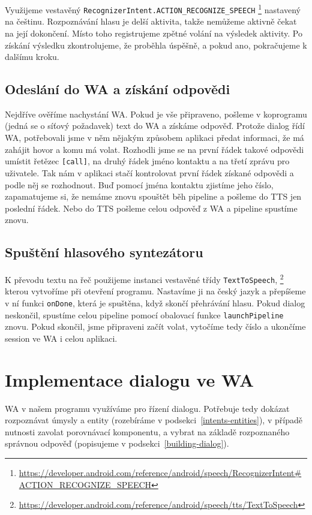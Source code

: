 Využijeme vestavěný \texttt{RecognizerIntent.ACTION\_RECOGNIZE\_SPEECH}%
\footnote{\url{https://developer.android.com/reference/android/speech/RecognizerIntent\#ACTION\_RECOGNIZE\_SPEECH}}
nastavený na češtinu. Rozpoznávání hlasu je delší aktivita, takže nemůžeme
aktivně čekat na její
dokončení. Místo toho registrujeme zpětné volání na výsledek aktivity.
Po získání výsledku zkontrolujeme, že proběhla úspěšně, a pokud ano, pokračujeme
k dalšímu kroku.

\subsection{Odeslání do WA a získání odpovědi}\label{contact-wa}
Nejdříve ověříme nachystání WA. Pokud je vše připraveno,
pošleme v koprogramu (jedná se o síťový požadavek) text do WA a získáme odpověď.
Protože dialog řídí WA, potřebovali jsme v něm nějakým způsobem aplikaci
předat informaci, že má zahájit hovor a komu má volat. Rozhodli jsme se na první
řádek takové odpovědi umístit řetězec \texttt{[call]}, na druhý řádek jméno kontaktu
a na třetí zprávu pro uživatele. Tak nám v aplikaci stačí kontrolovat první řádek získané
odpovědi a podle něj se rozhodnout. Buď pomocí jména kontaktu zjistíme jeho číslo, zapamatujeme
si, že nemáme znovu spouštět běh pipeline a pošleme do TTS jen poslední řádek.
Nebo do TTS pošleme celou odpověď z WA a pipeline spustíme znovu.

\subsection{Spuštění hlasového syntezátoru}\label{start-tts}

K převodu textu na řeč použijeme instanci vestavěné
třídy \texttt{TextToSpeech},%
\footnote{\url{https://developer.android.com/reference/android/speech/tts/TextToSpeech}}
kterou vytvoříme při otevření programu. Nastavíme
ji na český jazyk a přepíšeme v ní funkci \texttt{onDone}, která je spuštěna,
když skončí přehrávání hlasu. Pokud dialog neskončil, spustíme celou pipeline
pomocí obalovací funkce \texttt{launchPipeline} znovu. Pokud
skončil, jsme připraveni začít volat, vytočíme tedy číslo a ukončíme session ve
WA i celou aplikaci.

\section{Implementace dialogu ve WA}\label{wainit}

WA v našem programu využíváme pro řízení dialogu. Potřebuje tedy dokázat
rozpoznávat úmysly a entity (rozebíráme v podsekci~\ref{intents-entities}),
v případě nutnosti zavolat porovnávací komponentu, a vybrat na základě
rozpoznaného správnou odpověď (popisujeme v podsekci~\ref{building-dialog}).

